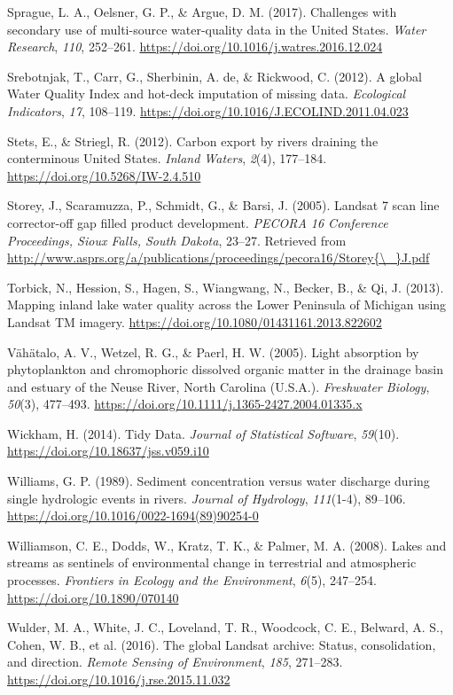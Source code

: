 \documentclass[]{article}
\begin{document}
\leavevmode\hypertarget{ref-Sprague2017}{}%
Sprague, L. A., Oelsner, G. P., \& Argue, D. M. (2017). Challenges with
secondary use of multi-source water-quality data in the United States.
\emph{Water Research}, \emph{110}, 252--261.
\url{https://doi.org/10.1016/j.watres.2016.12.024}

\leavevmode\hypertarget{ref-Srebotnjak2012}{}%
Srebotnjak, T., Carr, G., Sherbinin, A. de, \& Rickwood, C. (2012). A
global Water Quality Index and hot-deck imputation of missing data.
\emph{Ecological Indicators}, \emph{17}, 108--119.
\url{https://doi.org/10.1016/J.ECOLIND.2011.04.023}

\leavevmode\hypertarget{ref-Stets2012}{}%
Stets, E., \& Striegl, R. (2012). Carbon export by rivers draining the
conterminous United States. \emph{Inland Waters}, \emph{2}(4), 177--184.
\url{https://doi.org/10.5268/IW-2.4.510}

\leavevmode\hypertarget{ref-Storey2005}{}%
Storey, J., Scaramuzza, P., Schmidt, G., \& Barsi, J. (2005). Landsat 7
scan line corrector-off gap filled product development. \emph{PECORA 16
Conference Proceedings, Sioux Falls, South Dakota}, 23--27. Retrieved
from
\href{http://www.asprs.org/a/publications/proceedings/pecora16/Storey\%7B/_\%7DJ.pdf}{http://www.asprs.org/a/publications/proceedings/pecora16/Storey\{\textbackslash{}\_\}J.pdf}

\leavevmode\hypertarget{ref-Torbick2013}{}%
Torbick, N., Hession, S., Hagen, S., Wiangwang, N., Becker, B., \& Qi,
J. (2013). Mapping inland lake water quality across the Lower Peninsula
of Michigan using Landsat TM imagery.
\url{https://doi.org/10.1080/01431161.2013.822602}

\leavevmode\hypertarget{ref-Vahatalo2005}{}%
Vähätalo, A. V., Wetzel, R. G., \& Paerl, H. W. (2005). Light absorption
by phytoplankton and chromophoric dissolved organic matter in the
drainage basin and estuary of the Neuse River, North Carolina (U.S.A.).
\emph{Freshwater Biology}, \emph{50}(3), 477--493.
\url{https://doi.org/10.1111/j.1365-2427.2004.01335.x}

\leavevmode\hypertarget{ref-Wickham2014}{}%
Wickham, H. (2014). Tidy Data. \emph{Journal of Statistical Software},
\emph{59}(10). \url{https://doi.org/10.18637/jss.v059.i10}

\leavevmode\hypertarget{ref-Williams1989}{}%
Williams, G. P. (1989). Sediment concentration versus water discharge
during single hydrologic events in rivers. \emph{Journal of Hydrology},
\emph{111}(1-4), 89--106.
\url{https://doi.org/10.1016/0022-1694(89)90254-0}

\leavevmode\hypertarget{ref-Williamson2008}{}%
Williamson, C. E., Dodds, W., Kratz, T. K., \& Palmer, M. A. (2008).
Lakes and streams as sentinels of environmental change in terrestrial
and atmospheric processes. \emph{Frontiers in Ecology and the
Environment}, \emph{6}(5), 247--254.
\url{https://doi.org/10.1890/070140}

\leavevmode\hypertarget{ref-Wulder2016}{}%
Wulder, M. A., White, J. C., Loveland, T. R., Woodcock, C. E., Belward,
A. S., Cohen, W. B., et al. (2016). The global Landsat archive: Status,
consolidation, and direction. \emph{Remote Sensing of Environment},
\emph{185}, 271--283. \url{https://doi.org/10.1016/j.rse.2015.11.032}
\end{document}
